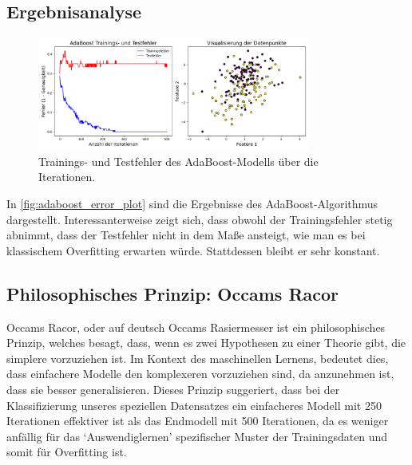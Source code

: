 \subsection{Ergebnisanalyse}
\begin{figure}[h]
    \centering
    \includegraphics[width=0.8\textwidth]{Images/AdaBoost_Error_and_Data.png}
    \caption{Trainings- und Testfehler des AdaBoost-Modells über die Iterationen.}
    \label{fig:adaboost_error_plot}
\end{figure}
In \autoref{fig:adaboost_error_plot} sind die Ergebnisse des AdaBoost-Algorithmus dargestellt. Interessanterweise zeigt sich, dass obwohl der Trainingsfehler stetig abnimmt, dass der Testfehler nicht in dem Maße ansteigt, wie man es bei klassischem Overfitting erwarten würde. Stattdessen bleibt er sehr konstant.

\subsection{Philosophisches Prinzip: Occams Racor}
Occams Racor, oder auf deutsch Occams Rasiermesser ist ein philosophisches Prinzip, welches besagt, dass, wenn es zwei Hypothesen zu einer Theorie gibt, die simplere vorzuziehen ist. Im Kontext des maschinellen Lernens, bedeutet dies, dass einfachere Modelle den komplexeren vorzuziehen sind, da anzunehmen ist, dass sie besser generalisieren. Dieses Prinzip suggeriert, dass bei der Klassifizierung unseres speziellen Datensatzes ein einfacheres Modell mit 250 Iterationen effektiver ist als das Endmodell mit 500 Iterationen, da es weniger anfällig für das `Auswendiglernen' spezifischer Muster der Trainingsdaten und somit für Overfitting ist.

